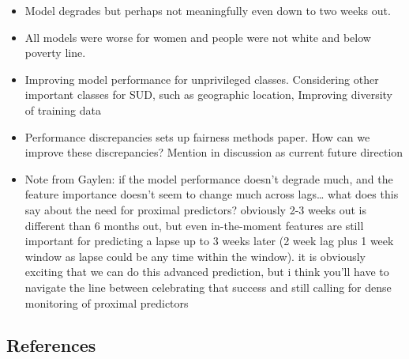 \documentclass[
]{agujournal2019}
\begin{document}
\begin{itemize}
\item
  Model degrades but perhaps not meaningfully even down to two weeks
  out.
\item
  All models were worse for women and people were not white and below
  poverty line.
\item
  Improving model performance for unprivileged classes. Considering
  other important classes for SUD, such as geographic location,
  Improving diversity of training data
\item
  Performance discrepancies sets up fairness methods paper. How can we
  improve these discrepancies? Mention in discussion as current future
  direction
\item
  Note from Gaylen: if the model performance doesn't degrade much, and
  the feature importance doesn't seem to change much across lags\ldots{}
  what does this say about the need for proximal predictors? obviously
  2-3 weeks out is different than 6 months out, but even in-the-moment
  features are still important for predicting a lapse up to 3 weeks
  later (2 week lag plus 1 week window as lapse could be any time within
  the window). it is obviously exciting that we can do this advanced
  prediction, but i think you'll have to navigate the line between
  celebrating that success and still calling for dense monitoring of
  proximal predictors
\end{itemize}

\subsection{References}\label{references}
\end{document}
